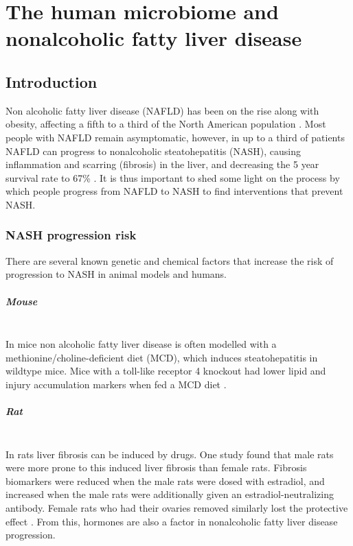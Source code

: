 \chapter{The human microbiome and nonalcoholic fatty liver disease}

\section{Introduction}
Non alcoholic fatty liver disease (NAFLD) has been on the rise along with obesity, affecting a fifth to a third of the North American population \cite{preiss2008non}. Most people with NAFLD remain asymptomatic, however, in up to a third of patients NAFLD can progress to nonalcoholic steatohepatitis (NASH), causing inflammation and scarring (fibrosis) in the liver, and decreasing the 5 year survival rate to 67\% \cite{propst1995prognosis}. It is thus important to shed some light on the process by which people progress from NAFLD to NASH to find interventions that prevent NASH.

\subsection{NASH progression risk}
There are several known genetic and chemical factors that increase the risk of progression to NASH in animal models and humans.

\paragraph{Mouse}\mbox{}\\
In mice non alcoholic fatty liver disease is often modelled with a methionine/choline-deficient diet (MCD), which induces steatohepatitis in wildtype mice. Mice with a toll-like receptor 4 knockout had lower lipid and injury accumulation markers when fed a MCD diet \cite{rivera2007toll}.

\paragraph{Rat}\mbox{}\\
In rats liver fibrosis can be induced by drugs. One study found that male rats were more prone to this induced liver fibrosis than female rats. Fibrosis biomarkers were reduced when the male rats were dosed with estradiol, and increased when the male rats were additionally given an estradiol-neutralizing antibody. Female rats who had their ovaries removed similarly lost the protective effect \cite{yasuda1999suppressive}. From this, hormones are also a factor in nonalcoholic fatty liver disease progression.

